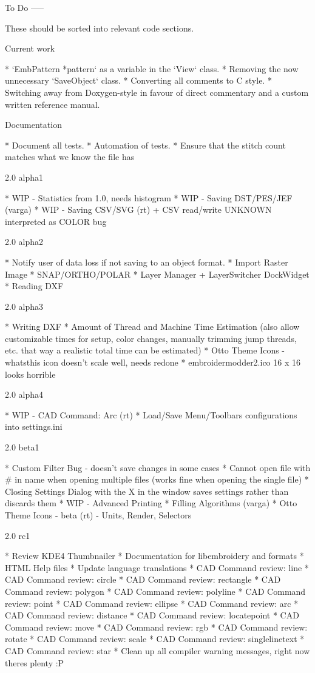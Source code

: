 \documentclass[a4paper]{report}
\begin{document}
{To Do
-----

These should be sorted into relevant code sections.

Current work
~~~~~~~~~~~~

* `EmbPattern *pattern` as a variable in the `View` class.
* Removing the now unnecessary `SaveObject` class.
* Converting all comments to C style.
* Switching away from Doxygen-style in favour of direct commentary and a custom written reference manual.

Documentation
~~~~~~~~~~~~~

* Document all tests.
* Automation of tests.
* Ensure that the stitch count matches what we know the file has


2.0 alpha1
~~~~~~~~~~

* WIP - Statistics from 1.0, needs histogram
* WIP - Saving DST/PES/JEF (varga)
* WIP - Saving CSV/SVG (rt) + CSV read/write UNKNOWN interpreted as COLOR bug

2.0 alpha2
~~~~~~~~~~

* Notify user of data loss if not saving to an object format.
* Import Raster Image
* SNAP/ORTHO/POLAR
* Layer Manager + LayerSwitcher DockWidget
* Reading DXF

2.0 alpha3
~~~~~~~~~~

* Writing DXF
* Amount of Thread and Machine Time Estimation (also allow customizable times for setup, color changes, manually trimming jump threads, etc. that way a realistic total time can be estimated)
* Otto Theme Icons - whatsthis icon doesn't scale well, needs redone
* embroidermodder2.ico 16 x 16 looks horrible

2.0 alpha4
~~~~~~~~~~

* WIP - CAD Command: Arc (rt)
* Load/Save Menu/Toolbars configurations into settings.ini

2.0 beta1
~~~~~~~~~

* Custom Filter Bug - doesn't save changes in some cases
* Cannot open file with \# in name when opening multiple files (works fine when opening the single file)
* Closing Settings Dialog with the X in the window saves settings rather than discards them
* WIP - Advanced Printing
* Filling Algorithms (varga)
* Otto Theme Icons - beta (rt) - Units, Render, Selectors

2.0 rc1
~~~~~~~

* Review KDE4 Thumbnailer
* Documentation for libembroidery and formats
* HTML Help files
* Update language translations
* CAD Command review: line
* CAD Command review: circle
* CAD Command review: rectangle
* CAD Command review: polygon
* CAD Command review: polyline
* CAD Command review: point
* CAD Command review: ellipse
* CAD Command review: arc
* CAD Command review: distance
* CAD Command review: locatepoint
* CAD Command review: move
* CAD Command review: rgb
* CAD Command review: rotate
* CAD Command review: scale
* CAD Command review: singlelinetext
* CAD Command review: star
* Clean up all compiler warning messages, right now theres plenty :P

}
\end{document}

